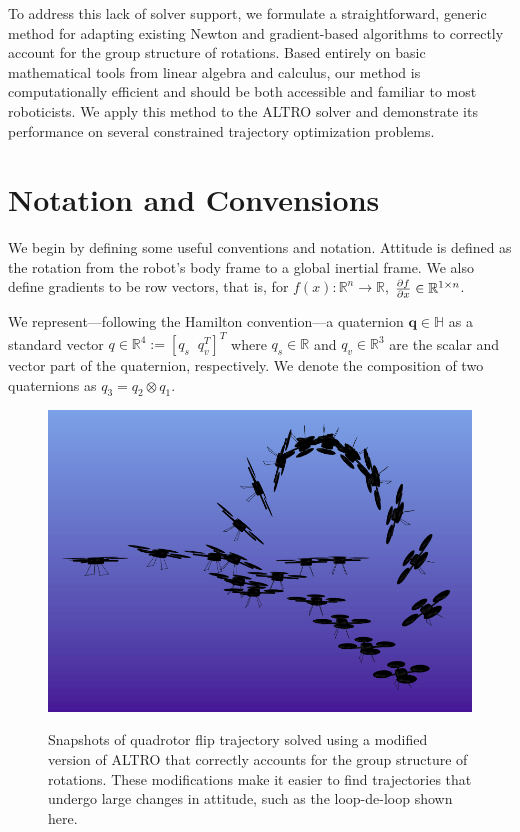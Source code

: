 \documentclass[letterpaper, 10 pt, conference]{ieeeconf}  %
\newcommand{\R}{\mathbb{R}}
\newcommand{\q}{\textbf{q}}
\begin{document}
    To address this lack of solver support, we formulate a straightforward, generic method for adapting
    existing Newton and gradient-based algorithms to correctly account for the group structure of
    rotations. Based entirely on basic mathematical tools from linear algebra and
    calculus, our method is computationally efficient and should be both accessible and
    familiar to most roboticists. We apply this method to the ALTRO solver
    \cite{howell2019altro} and demonstrate its performance on several constrained trajectory
    optimization problems.

\section{Notation and Convensions}

    We begin by defining some useful conventions and notation. 
    Attitude is defined as the rotation from the robot's body frame to a global inertial 
        frame. 
    We also define gradients to be row vectors, that is, for 
        $f(x) : \R^n \to \R$, $\pdv{f}{x} \in \R^{1\times n}$.

    We represent---following the Hamilton convention---a quaternion $\q \in \mathbb{H}$ as 
    a standard vector $q \in \R^4 := [q_s \;\; q_v^T]^T$ where $q_s \in \R$ and 
    $q_v \in \R^3$ are the scalar and vector part of the quaternion, respectively. We denote
    the composition of two quaternions as $q_3 = q_2 \otimes q_1$.
        
    \begin{figure}
        \centering
        \includegraphics[width=\columnwidth]{figures/quadflip_new.png}
        \label{fig:quadflip}
        \caption{Snapshots of quadrotor flip trajectory solved using a modified version of 
        ALTRO that correctly accounts for the group structure of rotations. These modifications
        make it easier to find trajectories that undergo large changes in attitude, such as
        the loop-de-loop shown here.}
    \end{figure}
\end{document}
